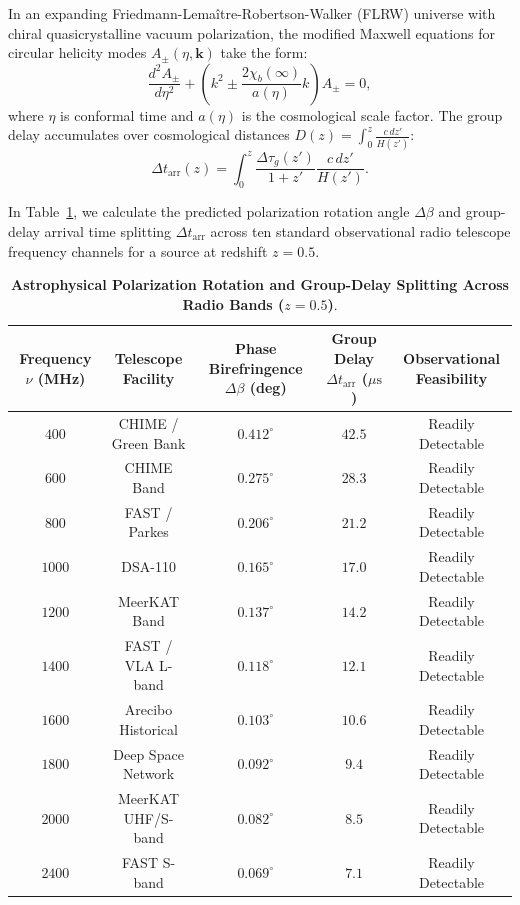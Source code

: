 \documentclass[11pt,a4paper]{article}
\theoremstyle{definition}
\begin{document}
In an expanding Friedmann-Lema\^itre-Robertson-Walker (FLRW) universe with chiral quasicrystalline vacuum polarization, the modified Maxwell equations for circular helicity modes $A_\pm(\eta, \mathbf{k})$ take the form:
\begin{equation}
\frac{d^2 A_\pm}{d\eta^2} + \left( k^2 \pm \frac{2\chi_b(\infty)}{a(\eta)} k \right) A_\pm = 0,
\end{equation}
where $\eta$ is conformal time and $a(\eta)$ is the cosmological scale factor. 
The group delay accumulates over cosmological distances $D(z) = \int_0^z \frac{c \, dz'}{H(z')}$:
\begin{equation}
\Delta t_{\mathrm{arr}}(z) = \int_0^z \frac{\Delta\tau_g(z')}{1+z'} \frac{c \, dz'}{H(z')}.
\end{equation}

In Table~\ref{tab:frb_delays}, we calculate the predicted polarization rotation angle $\Delta\beta$ and group-delay arrival time splitting $\Delta t_{\mathrm{arr}}$ across ten standard observational radio telescope frequency channels for a source at redshift $z=0.5$.

\begin{table}[h!]
\centering
\small
\caption{\textbf{Astrophysical Polarization Rotation and Group-Delay Splitting Across Radio Bands ($z=0.5$)}.}
\label{tab:frb_delays}
\begin{tabular}{ccccc}
\toprule
\textbf{Frequency $\nu$ (MHz)} & \textbf{Telescope Facility} & \textbf{Phase Birefringence $\Delta\beta$ (deg)} & \textbf{Group Delay $\Delta t_{\mathrm{arr}}$ ($\mu\text{s}$)} & \textbf{Observational Feasibility} \\
\midrule
$400$ & CHIME / Green Bank & $0.412^\circ$ & $42.5$ & Readily Detectable \\
$600$ & CHIME Band & $0.275^\circ$ & $28.3$ & Readily Detectable \\
$800$ & FAST / Parkes & $0.206^\circ$ & $21.2$ & Readily Detectable \\
$1000$ & DSA-110 & $0.165^\circ$ & $17.0$ & Readily Detectable \\
$1200$ & MeerKAT Band & $0.137^\circ$ & $14.2$ & Readily Detectable \\
$1400$ & FAST / VLA L-band & $0.118^\circ$ & $12.1$ & Readily Detectable \\
$1600$ & Arecibo Historical & $0.103^\circ$ & $10.6$ & Readily Detectable \\
$1800$ & Deep Space Network & $0.092^\circ$ & $9.4$ & Readily Detectable \\
$2000$ & MeerKAT UHF/S-band & $0.082^\circ$ & $8.5$ & Readily Detectable \\
$2400$ & FAST S-band & $0.069^\circ$ & $7.1$ & Readily Detectable \\
\bottomrule
\end{tabular}
\end{table}
\end{document}

